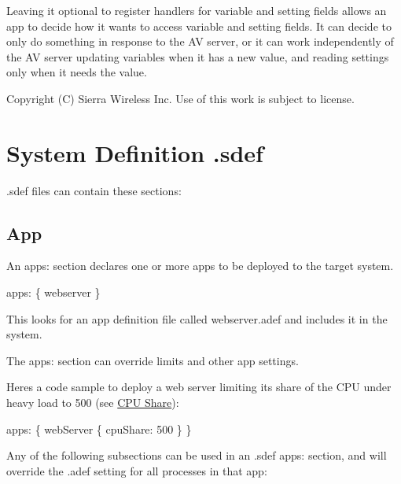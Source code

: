 Leaving it optional to register handlers for variable and setting fields allows an app to decide how it wants to access variable and setting fields. It can decide to only do something in response to the A\+V server, or it can work independently of the A\+V server updating variables when it has a new value, and reading settings only when it needs the value.





Copyright (C) Sierra Wireless Inc. Use of this work is subject to license. \hypertarget{defFilesSdef}{}\section{System Definition .sdef}\label{defFilesSdef}
{\ttfamily .sdef} files can contain these sections\+:\hypertarget{def_files_sdef_defFilesSdef_App}{}\subsection{App}\label{def_files_sdef_defFilesSdef_App}
An {\ttfamily apps\+:} section declares one or more apps to be deployed to the target system.


\begin{DoxyCode}
apps:
\{
    webserver
\}
\end{DoxyCode}


This looks for an app definition file called {\ttfamily webserver.\+adef} and includes it in the system.

The {\ttfamily apps\+:} section can override limits and other app settings.

Here\textquotesingle{}s a code sample to deploy a web server limiting its share of the C\+P\+U under heavy load to 500 (see \hyperlink{def_files_adef_defFilesAdef_cpuShare}{C\+P\+U Share})\+:


\begin{DoxyCode}
apps:
\{
    webServer
    \{
        cpuShare: 500
    \}
\}
\end{DoxyCode}


Any of the following subsections can be used in an {\ttfamily }.sdef {\ttfamily apps\+:} section, and will override the .adef setting for all processes in that app\+:

